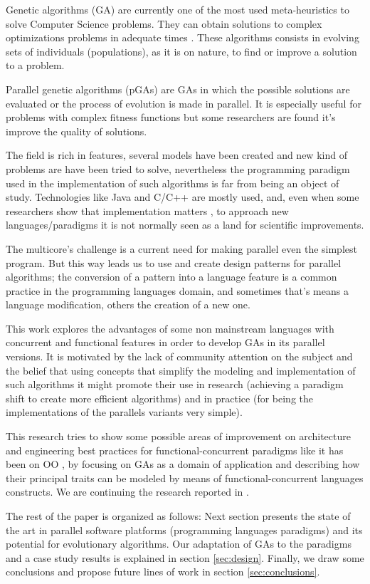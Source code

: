 
\noindent Genetic algorithms (GA) are currently one of the most used meta-heuristics to solve Computer Science problems. They can obtain solutions to complex optimizations problems in adequate times \cite{Luque2011}. These algorithms consists in evolving sets of individuals (populations), as it is on nature, to find or improve a solution to a problem.

Parallel genetic algorithms (pGAs) are GAs in which the possible solutions are evaluated or the process of evolution is made in parallel. It is especially useful for problems with complex fitness functions but some researchers are found \cite{Alba2001} it’s improve the quality of solutions.

The field is rich in features, several models have been created and new kind of problems are have been tried to solve, nevertheless the programming paradigm used in the implementation of such algorithms is far from being an object of study. Technologies like Java and C/C++ are mostly used, and, even when some researchers show that implementation matters \cite{DBLP:conf/iwann/MereloRACML11}, to approach new languages/paradigms it is not normally seen as a land for scientific improvements.

The multicore’s challenge \cite{SutterL05} is a current need for making parallel even the simplest program. But this way leads us to use and create design patterns for parallel algorithms; the conversion of a pattern into a language feature is a common practice in the programming languages domain, and sometimes that’s means a language modification, others the creation of a new one.

This work explores the advantages of some non mainstream languages with concurrent and functional features in order to develop GAs \cite{GA_Goldberg89} in its parallel versions. It is motivated by the lack of community attention on the subject and the belief that using concepts that simplify the modeling and implementation of such algorithms it might promote their use in research (achieving a paradigm shift to create more efficient algorithms) and in practice (for being the implementations of the parallels variants very simple).

This research tries to show some possible areas of improvement on architecture and engineering best practices for functional-concurrent paradigms like it has been on OO \cite{EO:FEA2000}, by focusing on GAs as a domain of application and describing how their principal traits can be modeled by means of functional-concurrent languages constructs. We are continuing the research reported in \cite{DBLP:conf/gecco/CruzGGC13,J.Albert-Cruz2013}.

The rest of the paper is organized as follows: Next section
presents the state of the art in parallel software platforms (programming languages paradigms) and its potential for evolutionary algorithms. Our
adaptation of GAs to the paradigms and a case study results is explained in section \ref{sec:design}. Finally, we draw some conclusions and propose future lines of work in section \ref{sec:conclusions}.